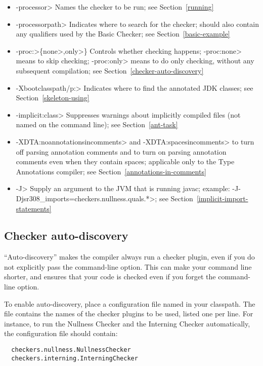 \begin{itemize}
\item \<-processor> Names the checker to be
  run; see Section~\ref{running}
\item \<-processorpath> Indicates where to search for the
  checker; should also contain any qualifiers used by the Basic
  Checker; see Section~\ref{basic-example}
\item \<-proc:>\{\<none>,\<only>\} Controls whether checking
  happens; \<-proc:none>
  means to skip checking; \<-proc:only> means to do only
  checking, without any subsequent compilation; see
  Section~\ref{checker-auto-discovery}
\item \<-Xbootclasspath/p:> Indicates where to find the annotated JDK classes;
  see Section~\ref{skeleton-using}
\item \<-implicit:class> Suppresses warnings about implicitly compiled files
  (not named on the command line); see Section~\ref{ant-task}
\item \<-XDTA:noannotationsincomments> and \<-XDTA:spacesincomments>
  to turn off parsing annotation comments and
  to turn on parsing annotation comments even when they
  contain spaces; applicable only to the Type Annotations compiler;
  see Section~\ref{annotations-in-comments}
\item \<-J> Supply an argument to the JVM that is running javac; example:
  \<-J-Djsr308\_imports=checkers.nullness.quals.*>; see Section~\ref{implicit-import-statements}
\end{itemize}


\subsection{Checker auto-discovery\label{checker-auto-discovery}}

``Auto-discovery'' makes the  compiler always run a checker
plugin, even if you do not explicitly pass the 
command-line option.  This can make your command line shorter, and ensures
that your code is checked even if you forget the command-line option.

To enable auto-discovery, place a configuration file named
in your classpath.  The file contains the names of the checker plugins to
be used, listed one per line.  For instance, to run the Nullness Checker and the
Interning Checker automatically, the configuration file should contain:

\begin{smaller}
\begin{Verbatim}
  checkers.nullness.NullnessChecker
  checkers.interning.InterningChecker
\end{Verbatim}
\end{smaller}

